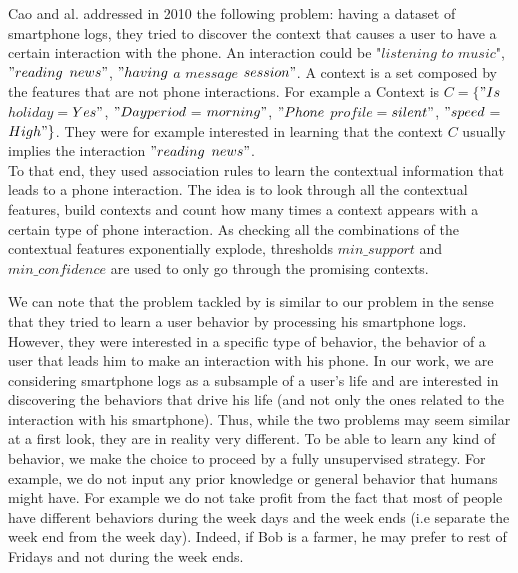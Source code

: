 Cao and al. \cite{interaction} addressed in 2010 the following problem: having a dataset of smartphone logs, they tried to discover the context that causes a user to have a certain interaction with the phone. An interaction could be "$listening$ $to$ $music$", $"reading$ $news"$, $"having$ $a$ $message$ $session"$. A context is a set composed by the features that are not phone interactions. For example a Context is $C= \{$$"Is$ $holiday$$=$$Yes"$, $"Day period$$=$$morning"$, $"Phone$ $profile$$=$$silent"$, $"speed$$=$$High"\}$. They were for example interested in learning that the context $C$ usually implies the interaction $"reading$ $news"$.
\\To that end, they used association rules to learn the contextual information that leads to a phone interaction. The idea is to look through all the contextual features, build contexts and count how many times a context appears with a certain type of phone interaction. As checking all the combinations of the contextual features exponentially explode, thresholds $min\_support$ and $min\_confidence$ are used to only go through the promising contexts. \par

We can note that the problem tackled by \cite{interaction} is similar to our problem in the sense that they tried to learn a user behavior by processing his smartphone logs. However, they were interested in a specific type of behavior, the behavior of a user that leads him to make an interaction with his phone. In our work, we are considering smartphone logs as a subsample of a user's life and are interested in discovering the behaviors that drive his life (and not only the ones related to the interaction with his smartphone). Thus, while the two problems may seem similar at a first look, they are in reality very different. To be able to learn any kind of behavior, we make the choice to proceed by a fully unsupervised strategy. For example, we do not input any prior knowledge or general behavior that humans might have. For example we do not take profit from the fact that most of people have different behaviors during the week days and the week ends (i.e separate the week end from the week day). Indeed, if Bob is a farmer, he may prefer to rest of Fridays and not during the week ends.\par

